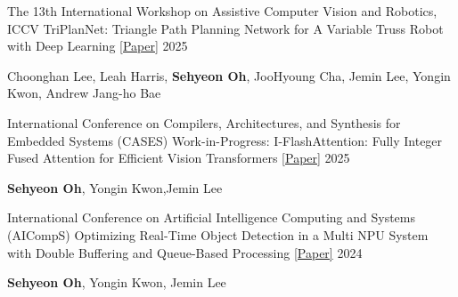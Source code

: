 
\begin{cventries}

    \cvpaper
    {The 13th International Workshop on Assistive Computer Vision and Robotics, ICCV} %
    {{TriPlanNet: Triangle Path Planning Network for A Variable Truss Robot with Deep Learning}
    \href{https://ksp.etri.re.kr/ksp/article/file/71365.pdf}{[Paper]}
    } %
    {} %
    {2025} %
    {
      \begin{cvitems} %
        \item{Choonghan Lee, Leah Harris, \textbf{Sehyeon Oh}, JooHyoung Cha, Jemin Lee, Yongin Kwon, Andrew Jang-ho Bae}
      \end{cvitems}
    }

    \cvpaper
    {International Conference on Compilers, Architectures, and Synthesis for Embedded Systems (CASES)} %
    {{Work-in-Progress: I-FlashAttention: Fully Integer Fused Attention for Efficient Vision Transformers}
    \href{https://ksp.etri.re.kr/ksp/article/file/71267.pdf}{[Paper]}
    } %
    {} %
    {2025} %
    {
      \begin{cvitems} %
        \item{\textbf{Sehyeon Oh}, Yongin Kwon,Jemin Lee}
      \end{cvitems}
    }


    \cvpaper
    {International Conference on Artificial Intelligence Computing and Systems (AICompS)} %
    {{Optimizing Real-Time Object Detection in a Multi NPU System with Double Buffering and Queue-Based Processing}
    \href{https://ksp.etri.re.kr/ksp/article/file/70481.pdf}{[Paper]}
    } %
    {} %
    {2024} %
    {
      \begin{cvitems} %
        \item{\textbf{Sehyeon Oh}, Yongin Kwon, Jemin Lee}
      \end{cvitems}
    }


\end{cventries}
